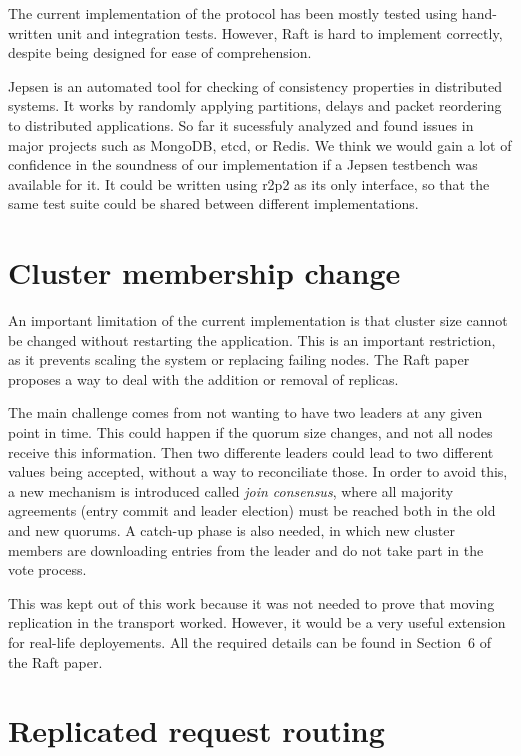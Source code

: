The current implementation of the protocol has been mostly tested using hand-written unit and integration tests.
However, Raft is hard to implement correctly, despite being designed for ease of comprehension.


Jepsen\cite{jepsen} is an automated tool for checking of consistency properties in distributed systems.
It works by randomly applying partitions, delays and packet reordering to distributed applications.
So far it sucessfuly analyzed and found issues in major projects such as MongoDB, etcd, or Redis.
We think we would gain a lot of confidence in the soundness of our implementation if a Jepsen testbench was available for it.
It could be written using \gls{r2p2} as its only interface, so that the same test suite could be shared between different implementations.

\section{Cluster membership change}

An important limitation of the current implementation is that cluster size cannot be changed without restarting the application.
This is an important restriction, as it prevents scaling the system or replacing failing nodes.
The Raft paper\cite{raft} proposes a way to deal with the addition or removal of replicas.

The main challenge comes from not wanting to have two leaders at any given point in time.
This could happen if the quorum size changes, and not all nodes receive this information.
Then two differente leaders could lead to two different values being accepted, without a way to reconciliate those.
In order to avoid this, a new mechanism is introduced called \emph{join consensus}, where all majority agreements (entry commit and leader election) must be reached both in the old and new quorums.
A catch-up phase is also needed, in which new cluster members are downloading entries from the leader and do not take part in the vote process.

This was kept out of this work because it was not needed to prove that moving replication in the transport worked.
However, it would be a very useful extension for real-life deployements.
All the required details can be found in Section~6 of the Raft paper\cite[p.~10]{raft}.


\section{Replicated request routing}

